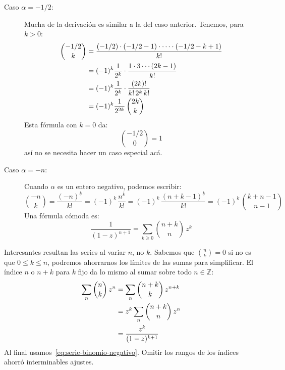 \begin{description}
  \item[\boldmath Caso \(\alpha = -1/2\):\unboldmath]
    Mucha de la derivación es similar a la del caso anterior.
    Tenemos,
    para \(k > 0\):
    \begin{align}
      \binom{-1/2}{k}
        &= \frac{(-1/2) \cdot (-1/2 - 1) \cdot \dotsm
                   \cdot (-1/2 - k + 1)}
                {k!} \notag \\
        &= (-1)^k \frac{1}{2^k}
             \cdot \frac{1 \cdot 3 \dotsm (2 k - 1)}{k!} \notag \\
        &= (-1)^k \frac{1}{2^k}
             \cdot \frac{(2 k)!}{k! \, 2^k \, k!} \notag \\
        &= (-1)^k \frac{1}{2^{2 k}} \, \binom{2 k}{k}
            \label{eq:binomial(-1/2,k)}
    \end{align}
    Esta fórmula con \(k = 0\) da:
    \begin{equation*}
      \binom{-1/2}{0} = 1
    \end{equation*}
    así no se necesita hacer un caso especial acá.
  \item[\boldmath Caso \(\alpha = -n\):\unboldmath]
    Cuando \(\alpha\) es un entero negativo,
    podemos escribir:
    \begin{equation}
      \label{eq:binomial(-n,k)}
      \binom{-n}{k}
        = \frac{(-n)^{\underline{k}}}{k!}
        = (-1)^k \, \frac{n^{\overline{k}}}{k!}
        = (-1)^k \, \frac{(n + k - 1)^{\underline{k}}}{k!}
        = (-1)^k \, \binom{k + n - 1}{n - 1}
    \end{equation}
    Una fórmula cómoda es:
    \begin{equation}
      \label{eq:serie-binomio-negativo}
      \frac{1}{(1 - z)^{n + 1}}
        = \sum_{k \ge 0} \binom{n + k}{n} \, z^k
    \end{equation}
  \end{description}
  Interesantes resultan las series al variar \(n\), no \(k\).
  Sabemos que \(\binom{n}{k} = 0\) si no es que \(0 \le k \le n\),
  podremos ahorrarnos los límites de las sumas para simplificar.
  El índice \(n\) o \(n + k\) para \(k\) fijo
  da lo mismo al sumar sobre todo \(n \in \mathbb{Z}\):
  \begin{align}
    \sum_n \binom{n}{k} \, z^n
      &= \sum_n \binom{n + k}{k} \, z^{n + k} \notag \\
      &= z^k \sum_n \binom{n + k}{n} \, z^n \notag \\
      &= \frac{z^k}{(1 - z)^{k + 1}}
            \label{eq:serie-binomio-n}
  \end{align}
  Al final usamos~\eqref{eq:serie-binomio-negativo}.
  Omitir los rangos de los índices ahorró interminables ajustes.
